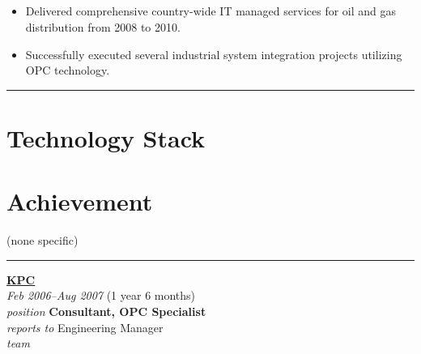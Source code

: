 \documentclass[12pt]{res}
\begin{document}
\begin{resume}
\begin{multicols}{2}
	\section{}
		\begin{itemize}
			\setlength{\itemindent}{0pt}
			\item Delivered comprehensive country-wide IT managed services for oil and gas distribution from 2008 to 2010.
\item Successfully executed several industrial system integration projects utilizing OPC technology.
		\end{itemize}
\end{multicols}

\vspace{-20pt}
\begin{minipage}[t]{0.55\linewidth}
	\rule{0.25\textwidth}{2pt}
	\begin{multicols}{2}
		\section{Technology Stack}
		\columnbreak
		\section{}
	\end{multicols}
	\vspace{1pt}
\end{minipage}
\hfill
\begin{minipage}[t]{0.42\linewidth}
	\vspace{18pt}
	\section{Achievement}
	\begin{flushleft}
        \footnotesize{\vspace{2.6pt}
(none specific)}
	\end{flushleft}
\end{minipage}

\vspace{10pt}
\rule{1.0\textwidth}{0.1pt}

\begin{multicols}{2}
	{\large {\bf \href{https://kpc.co.id}{KPC}}} \\
	{\footnotesize{\sl Feb 2006--Aug 2007} \hfill (1 year 6 months)}\\
	{\footnotesize{\sl position} \hfill \bf{Consultant, OPC Specialist}}\\
	{\footnotesize{\sl reports to} \hfill Engineering Manager}\\
	{\footnotesize{\sl team} \hfill }\\


\end{multicols}
\end{resume}
\end{document}

